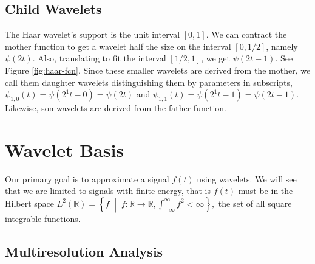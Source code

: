 \documentclass{article}
\def\RR{\mathbb{R}}
\theoremstyle{definition}
\begin{document}
  \subsection{Child Wavelets}

  The Haar wavelet's support is the unit interval \([0,1]\). We can contract the mother function to get a wavelet half the size on the interval \([0,1/2]\), namely \(\psi(2t)\). Also, translating to fit the interval \([1/2,1]\), we get \(\psi(2t-1)\). See Figure \ref{fig:haar-fcn}. Since these smaller wavelets are derived from the mother, we call them daughter wavelets distinguishing them by parameters in subscripts, \(\psi_{1,0}(t) = \psi(2^1t-0) = \psi(2t)\) and \(\psi_{1,1}(t) = \psi(2^1t - 1) = \psi(2t-1)\). Likewise, son wavelets are derived from the father function.
  
  \section{Wavelet Basis}

  Our primary goal is to approximate a signal \(f(t)\) using wavelets. We will see that we are limited to signals with finite energy, that is \(f(t)\) must be in the Hilbert space
  \(L^2(\RR) = \left\{f \; \middle| \; f : \RR \to \RR, \int_{-\infty}^\infty f^2 < \infty\right\},\)
  the set of all square integrable functions.

  \subsection{Multiresolution Analysis}
\end{document}
